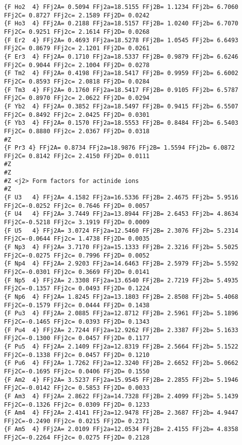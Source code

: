 {\begin{verbatim}
{F Ho2  4} FFj2A= 0.5094 FFj2a=18.5155 FFj2B= 1.1234 FFj2b= 6.7060 FFj2C= 0.8727 FFj2c= 2.1589 FFj2D= 0.0242 
{F Ho3  4} FFj2A= 0.2188 FFj2a=18.5157 FFj2B= 1.0240 FFj2b= 6.7070 FFj2C= 0.9251 FFj2c= 2.1614 FFj2D= 0.0268 
{F Er2  4} FFj2A= 0.4693 FFj2a=18.5278 FFj2B= 1.0545 FFj2b= 6.6493 FFj2C= 0.8679 FFj2c= 2.1201 FFj2D= 0.0261 
{F Er3  4} FFj2A= 0.1710 FFj2a=18.5337 FFj2B= 0.9879 FFj2b= 6.6246 FFj2C= 0.9044 FFj2c= 2.1004 FFj2D= 0.0278 
{F Tm2  4} FFj2A= 0.4198 FFj2a=18.5417 FFj2B= 0.9959 FFj2b= 6.6002 FFj2C= 0.8593 FFj2c= 2.0818 FFj2D= 0.0284 
{F Tm3  4} FFj2A= 0.1760 FFj2a=18.5417 FFj2B= 0.9105 FFj2b= 6.5787 FFj2C= 0.8970 FFj2c= 2.0622 FFj2D= 0.0294 
{F Yb2  4} FFj2A= 0.3852 FFj2a=18.5497 FFj2B= 0.9415 FFj2b= 6.5507 FFj2C= 0.8492 FFj2c= 2.0425 FFj2D= 0.0301 
{F Yb3  4} FFj2A= 0.1570 FFj2a=18.5553 FFj2B= 0.8484 FFj2b= 6.5403 FFj2C= 0.8880 FFj2c= 2.0367 FFj2D= 0.0318 
#Z
{F Pr3 4} FFj2A= 0.8734 FFj2a=18.9876 FFj2B= 1.5594 FFj2b= 6.0872 FFj2C= 0.8142 FFj2c= 2.4150 FFj2D= 0.0111 
#Z
#Z
#Z <j2> Form factors for actinide ions
#Z
{F U3   4} FFj2A= 4.1582 FFj2a=16.5336 FFj2B= 2.4675 FFj2b= 5.9516 FFj2C=-0.0252 FFj2c= 0.7646 FFj2D= 0.0057 
{F U4   4} FFj2A= 3.7449 FFj2a=13.8944 FFj2B= 2.6453 FFj2b= 4.8634 FFj2C=-0.5218 FFj2c= 3.1919 FFj2D= 0.0009 
{F U5   4} FFj2A= 3.0724 FFj2a=12.5460 FFj2B= 2.3076 FFj2b= 5.2314 FFj2C=-0.0644 FFj2c= 1.4738 FFj2D= 0.0035 
{F Np3  4} FFj2A= 3.7170 FFj2a=15.1333 FFj2B= 2.3216 FFj2b= 5.5025 FFj2C=-0.0275 FFj2c= 0.7996 FFj2D= 0.0052 
{F Np4  4} FFj2A= 2.9203 FFj2a=14.6463 FFj2B= 2.5979 FFj2b= 5.5592 FFj2C=-0.0301 FFj2c= 0.3669 FFj2D= 0.0141 
{F Np5  4} FFj2A= 2.3308 FFj2a=13.6540 FFj2B= 2.7219 FFj2b= 5.4935 FFj2C=-0.1357 FFj2c= 0.0493 FFj2D= 0.1224 
{F Np6  4} FFj2A= 1.8245 FFj2a=13.1803 FFj2B= 2.8508 FFj2b= 5.4068 FFj2C=-0.1579 FFj2c= 0.0444 FFj2D= 0.1438 
{F Pu3  4} FFj2A= 2.0885 FFj2a=12.8712 FFj2B= 2.5961 FFj2b= 5.1896 FFj2C=-0.1465 FFj2c= 0.0393 FFj2D= 0.1343 
{F Pu4  4} FFj2A= 2.7244 FFj2a=12.9262 FFj2B= 2.3387 FFj2b= 5.1633 FFj2C=-0.1300 FFj2c= 0.0457 FFj2D= 0.1177 
{F Pu5  4} FFj2A= 2.1409 FFj2a=12.8319 FFj2B= 2.5664 FFj2b= 5.1522 FFj2C=-0.1338 FFj2c= 0.0457 FFj2D= 0.1210 
{F Pu6  4} FFj2A= 1.7262 FFj2a=12.3240 FFj2B= 2.6652 FFj2b= 5.0662 FFj2C=-0.1695 FFj2c= 0.0406 FFj2D= 0.1550 
{F Am2  4} FFj2A= 3.5237 FFj2a=15.9545 FFj2B= 2.2855 FFj2b= 5.1946 FFj2C=-0.0142 FFj2c= 0.5853 FFj2D= 0.0033 
{F Am3  4} FFj2A= 2.8622 FFj2a=14.7328 FFj2B= 2.4099 FFj2b= 5.1439 FFj2C=-0.1326 FFj2c= 0.0309 FFj2D= 0.1233 
{F Am4  4} FFj2A= 2.4141 FFj2a=12.9478 FFj2B= 2.3687 FFj2b= 4.9447 FFj2C=-0.2490 FFj2c= 0.0215 FFj2D= 0.2371 
{F Am5  4} FFj2A= 2.0109 FFj2a=12.0534 FFj2B= 2.4155 FFj2b= 4.8358 FFj2C=-0.2264 FFj2c= 0.0275 FFj2D= 0.2128 

\end{verbatim}}
